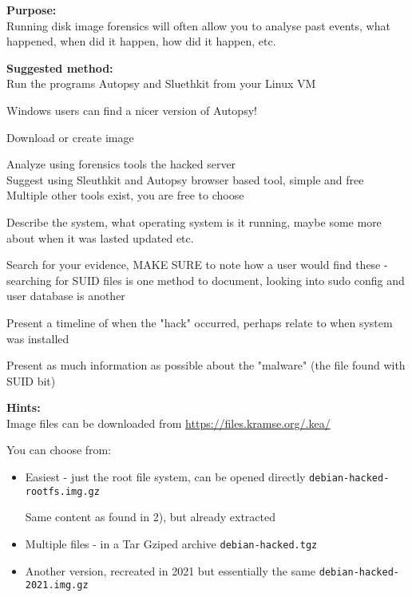 \documentclass[a4paper,11pt,notitlepage]{report}
\begin{document}
{\bf Purpose:}\\
Running disk image forensics will often allow you to analyse past events, what happened, when did it happen, how did it happen, etc.

{\bf Suggested method:}\\
Run the programs Autopsy and Sluethkit from your Linux VM

Windows users can find a nicer version of Autopsy!

\begin{list2}
\item Download or create image
\item Analyze using forensics tools the hacked server\\
Suggest using Sleuthkit and Autopsy browser based tool, simple and free\\
Multiple other tools exist, you are free to choose
\item Describe the system, what operating system is it running, maybe some more about when it was lasted updated etc.
\item Search for your evidence, MAKE SURE to note how a user would find these - searching for SUID files is one method to document, looking into sudo config and user database is another
\item Present a timeline of when the "hack" occurred, perhaps relate to when system was installed
\item Present as much information as possible about the "malware" (the file found with SUID bit)
\end{list2}




{\bf Hints:}\\
Image files can be downloaded from \url{https://files.kramse.org/.kea/}

You can choose from:

\begin{itemize}
\item Easiest - just the root file system, can be opened directly
 \verb+debian-hacked-rootfs.img.gz+

Same content as found in 2), but already extracted

\item Multiple files - in a Tar Gziped archive
\verb+debian-hacked.tgz+

\item Another version, recreated in 2021 but essentially the same
\verb+debian-hacked-2021.img.gz+
\end{itemize}
\end{document}

